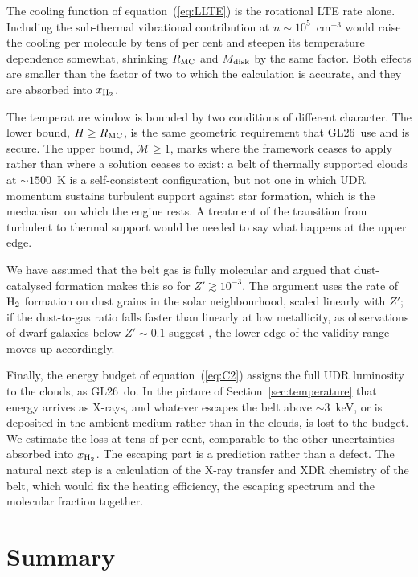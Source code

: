 \documentclass[twocolumn,pdftex]{aastex701}
\newcommand{\xhh}{x_{\rm H_2}}
\newcommand{\Zp}{Z'}
\newcommand{\GL}{GL26}
\newcommand{\Htwo}{{\rm H_2}}
\begin{document}
The cooling function of equation~(\ref{eq:LLTE}) is the rotational LTE rate alone. Including the sub-thermal vibrational contribution at $n\sim10^{5}$~cm$^{-3}$ would raise the cooling per molecule by tens of per cent and steepen its temperature dependence somewhat, shrinking $R_{\rm MC}$ and $M_{\rm disk}$ by the same factor. Both effects are smaller than the factor of two to which the calculation is accurate, and they are absorbed into $\xhh$.

The temperature window is bounded by two conditions of different character. The lower bound, $H\ge R_{\rm MC}$, is the same geometric requirement that \GL\ use and is secure. The upper bound, $\mathcal{M}\ge1$, marks where the framework ceases to apply rather than where a solution ceases to exist: a belt of thermally supported clouds at $\sim1500$~K is a self-consistent configuration, but not one in which UDR momentum sustains turbulent support against star formation, which is the mechanism on which the engine rests. A treatment of the transition from turbulent to thermal support would be needed to say what happens at the upper edge.

We have assumed that the belt gas is fully molecular and argued that dust-catalysed formation makes this so for $\Zp\gtrsim10^{-3}$. The argument uses the rate of $\Htwo$ formation on dust grains in the solar neighbourhood, scaled linearly with $\Zp$; if the dust-to-gas ratio falls faster than linearly at low metallicity, as observations of dwarf galaxies below $\Zp\sim0.1$ suggest \citep{Remy-Ruyer:2014a,Galliano:2018a}, the lower edge of the validity range moves up accordingly.

Finally, the energy budget of equation~(\ref{eq:C2}) assigns the full UDR luminosity to the clouds, as \GL\ do. In the picture of Section~\ref{sec:temperature} that energy arrives as X-rays, and whatever escapes the belt above $\sim3$~keV, or is deposited in the ambient medium rather than in the clouds, is lost to the budget. We estimate the loss at tens of per cent, comparable to the other uncertainties absorbed into $\xhh$. The escaping part is a prediction rather than a defect. The natural next step is a calculation of the X-ray transfer and XDR chemistry of the belt, which would fix the heating efficiency, the escaping spectrum and the molecular fraction together.

\section{Summary}\label{sec:summary}
\end{document}
